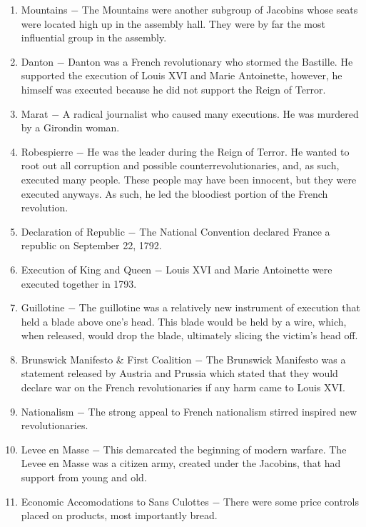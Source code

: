\documentclass[12pt]{article}
\begin{document}
\begin{enumerate}
\item Mountains $-$ The Mountains were another subgroup of Jacobins whose seats were located high up in the assembly hall. They were by far the most influential group in the assembly.

\item Danton $-$ Danton was a French revolutionary who stormed the Bastille. He supported the execution of Louis XVI and Marie Antoinette, however, he himself was executed because he did not support the Reign of Terror.

\item Marat $-$ A radical journalist who caused many executions. He was murdered by a Girondin woman.

\item Robespierre $-$ He was the leader during the Reign of Terror. He wanted to root out all corruption and possible counterrevolutionaries, and, as such, executed many people. These people may have been innocent, but they were executed anyways. As such, he led the bloodiest portion of the French revolution.

\item Declaration of Republic $-$ The National Convention declared France a republic on September 22, 1792.

\item Execution of King and Queen $-$ Louis XVI and Marie Antoinette were executed together in 1793. 

\item Guillotine $-$ The guillotine was a relatively new instrument of execution that held a blade above one's head. This blade would be held by a wire, which, when released, would drop the blade, ultimately slicing the victim's head off.

\item Brunswick Manifesto \& First Coalition $-$ The Brunswick Manifesto was a statement released by Austria and Prussia which stated that they would declare war on the French revolutionaries if any harm came to Louis XVI.

\item Nationalism $-$ The strong appeal to French nationalism stirred inspired new revolutionaries.

\item Levee en Masse $-$ This demarcated the beginning of modern warfare. The Levee en Masse was a citizen army, created under the Jacobins, that had support from young and old.

\item Economic Accomodations to Sans Culottes $-$ There were some price controls placed on products, most importantly bread.


\end{enumerate}
\end{document}
